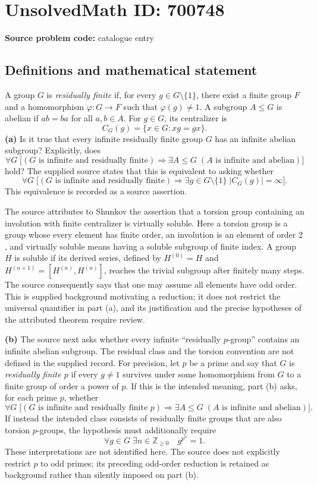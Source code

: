 \documentclass[11pt]{article}
\newcommand{\Z}{\mathbb{Z}}
\begin{document}
\section*{UnsolvedMath ID: 700748}
\textbf{Source problem code:} catalogue entry
\subsection{Definitions and mathematical statement}
A group $G$ is \emph{residually finite} if, for every $g\in G\setminus\{1\}$, there exist a finite group $F$ and a homomorphism $\varphi:G\to F$ such that $\varphi(g)\ne1$. A subgroup $A\le G$ is abelian if $ab=ba$ for all $a,b\in A$. For $g\in G$, its centralizer is
\[
C_G(g)=\{x\in G:xg=gx\}.
\]
\textbf{(a)} Is it true that every infinite residually finite group $G$ has an infinite abelian subgroup? Explicitly, does
\[
\forall G\;\bigl[(G\text{ is infinite and residually finite})\Longrightarrow \exists A\le G\;(A\text{ is infinite and abelian})\bigr]
\]
hold? The supplied source states that this is equivalent to asking whether
\[
\forall G\;\bigl[(G\text{ is infinite and residually finite})\Longrightarrow \exists g\in G\setminus\{1\}\;|C_G(g)|=\infty\bigr].
\]
This equivalence is recorded as a source assertion.

The source attributes to Shunkov the assertion that a torsion group containing an involution with finite centralizer is virtually soluble. Here a torsion group is a group whose every element has finite order, an involution is an element of order $2$, and virtually soluble means having a soluble subgroup of finite index. A group $H$ is soluble if its derived series, defined by $H^{(0)}=H$ and $H^{(n+1)}=[H^{(n)},H^{(n)}]$, reaches the trivial subgroup after finitely many steps. The source consequently says that one may assume all elements have odd order. This is supplied background motivating a reduction; it does not restrict the universal quantifier in part (a), and its justification and the precise hypotheses of the attributed theorem require review.

\textbf{(b)} The source next asks whether every infinite ``residually $p$-group'' contains an infinite abelian subgroup. The residual class and the torsion convention are not defined in the supplied record. For precision, let $p$ be a prime and say that $G$ is \emph{residually finite $p$} if every $g\ne1$ survives under some homomorphism from $G$ to a finite group of order a power of $p$. If this is the intended meaning, part (b) asks, for each prime $p$, whether
\[
\forall G\;\bigl[(G\text{ is infinite and residually finite }p)\Longrightarrow \exists A\le G\;(A\text{ is infinite and abelian})\bigr].
\]
If instead the intended class consists of residually finite groups that are also torsion $p$-groups, the hypothesis must additionally require
\[
\forall g\in G\;\exists n\in\Z_{\ge0}\quad g^{p^n}=1.
\]
These interpretations are not identified here. The source does not explicitly restrict $p$ to odd primes; its preceding odd-order reduction is retained as background rather than silently imposed on part (b).
\end{document}
